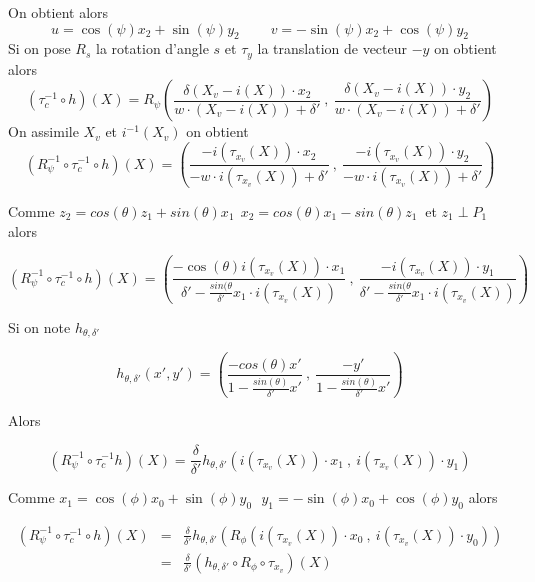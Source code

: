 On obtient alors 
\begin{equation*}
u=\cos(\psi)x_{2}+\sin(\psi)y_{2}~~~~~~~~~~v=-\sin(\psi)x_{2}+\cos(\psi)y_{2}
\end{equation*}
Si on pose $R_{s}$ la rotation d'angle $s$ et $\tau_{y}$ la translation de vecteur $-y$ on obtient alors 
\begin{equation*}
(\tau_{c}^{-1} \circ h)(X) = R_{\psi}\left(\frac{\delta (X_{v}-i(X))\cdot x_{2} }{w \cdot (X_{v}-i(X))+\delta'}~,~\frac{\delta (X_{v}-i(X))\cdot y_{2}}{w \cdot (X_{v}-i(X))+\delta'}  \right) 
\end{equation*}
On assimile $X_{v}$ et $i^{-1}(X_{v})$ on obtient 
\begin{equation*}
(R_{\psi}^{-1} \circ \tau_{c}^{-1}  \circ h)(X)=\left(\frac{-i(\tau_{x_{v}} (X))\cdot x_{2} }{-w \cdot i(\tau_{x_{v}} (X))+\delta'}~,~\frac{-i(\tau_{x_{v}} (X))\cdot y_{2}}{-w \cdot i(\tau_{x_{v}} (X))+\delta'}  \right) 
\end{equation*}

Comme $z_{2}=cos(\theta)z_{1}+sin(\theta)x_{1}~~x_{2}=cos(\theta)x_{1}-sin(\theta)z_{1}~$ et $z_{1}\perp P_{1}$ alors

\begin{equation*}
(R_{\psi}^{-1} \circ \tau_{c}^{-1}  \circ h)(X)=\left(\frac{-\cos(\theta)i(\tau_{x_{v}} (X))\cdot x_{1} }{\delta'-\frac{sin(\theta}{\delta'}x_{1}\cdot i(\tau_{x_{v}}(X))}~,~\frac{-i(\tau_{x_{v}} (X))\cdot y_{1}}{\delta'-\frac{sin(\theta}{\delta'}x_{1}\cdot i(\tau_{x_{v}}(X))}  \right) 
\end{equation*}

Si on note $h_{\theta,\delta'}$ 

\begin{equation*}
h_{\theta,\delta'}(x',y')=\left(\frac{-cos(\theta)x'}{1-\frac{sin(\theta)}{\delta'}x'} ~,~\frac{-y'}{1-\frac{sin(\theta)}{\delta'}x'}\right)
\end{equation*}

Alors 

\begin{equation*}
(R_{\psi}^{-1} \circ \tau_{c}^{-1} h)(X)= \frac{\delta}{\delta'}h_{\theta,\delta'}\left ( i(\tau_{x_{v}}(X)) \cdot x_{1}~,~ i(\tau_{x_{v}}(X)) \cdot y_{1}\right)
\end{equation*}

Comme $x_{1}=\cos(\phi)x_{0}+\sin(\phi)y_{0}~~~y_{1}=-\sin(\phi)x_{0}+\cos(\phi)y_{0}$ alors

\begin{eqnarray*}
(R_{\psi}^{-1} \circ \tau_{c}^{-1} \circ h)(X) &=& \frac{\delta}{\delta'}h_{\theta,\delta'}\left ( R_{\phi}(i(\tau_{x_{v}}(X)) \cdot x_{0}~,~ i(\tau_{x_{v}}(X)) \cdot y_{0})\right)\\
                                               &=&\frac{\delta}{\delta'} (h_{\theta,\delta'}\circ R_{\phi} \circ \tau_{x_{v}})(X)
\end{eqnarray*}

